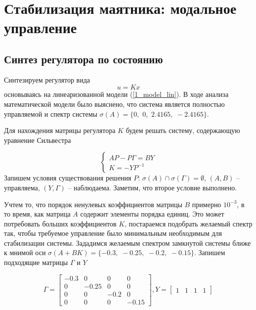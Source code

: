 \chapter{Стабилизация маятника: модальное управление}
\label{ch:chap3}

\section{Синтез регулятора по состоянию}

Синтезируем регулятор вида 
\begin{equation}
    u = Kx
\end{equation}
основываясь на линеаризованной модели (\ref{1_model_lin}). В ходе анализа математической модели было выяснено, что система является полностью управляемой и спектр системы $\sigma(A) = \{ 0,\, \,  0, \, \,  2.4165,\, \,  -2.4165\}$.


Для нахождения матрицы регулятора $K$ будем решать систему, содержающую уравнение Сильвестра

\begin{equation}
    \label{3_sil_reg}
    \begin{cases}
        AP -P \Gamma = BY\\
        K = -YP^{-1}
    \end{cases}
\end{equation}
Запишем условия существования решения $P$: $\sigma(A) \cap \sigma(\Gamma) = \emptyset$, $(A,B)$ -- управляема, $(Y, \Gamma)$ -- наблюдаема. Заметим, что второе условие выполнено. 

Учтем то, что порядок ненулевых коэффициентов матрицы $B$ примерно $10^{-3}$, в то время, как матрица $A$ содержит элементы порядка единиц. Это может потребовать больших коэффициентов $K$, постараемся подобрать желаемый спектр так, чтобы требуемое управление было минимальным необходимым для стабилизации системы.  Зададимся желаемым спектром замкнутой системы ближе к мнимой оси $\sigma (A+BK) = \{-0.3, \, \, -0.25, \, \, -0.2, \, \, -0.15 \}$. Запишем подходящие матрицы $\Gamma$ и $Y$

\begin{equation}
    \Gamma = \begin{bmatrix}
        -0.3 & 0 & 0 & 0\\
        0 & -0.25 & 0 & 0\\
        0 & 0 & -0.2 & 0\\
        0 & 0 & 0 & -0.15
    \end{bmatrix}, 
    Y = \begin{bmatrix}
        1 & 1 & 1 & 1
    \end{bmatrix}
\end{equation}

